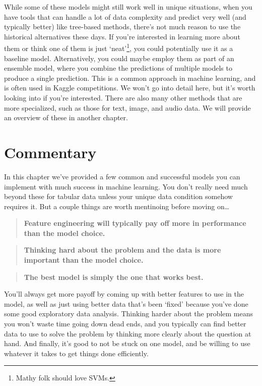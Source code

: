 \documentclass[
  letterpaper,
]{krantz}
\begin{document}
While some of these models might still work well in unique situations,
when you have tools that can handle a lot of data complexity and predict
very well (and typically better) like tree-based methods, there's not
much reason to use the historical alternatives these days. If you're
interested in learning more about them or think one of them is just
`neat'\footnote{Mathy folk should love SVMs.}, you could potentially use
it as a baseline model. Alternatively, you could maybe employ them as
part of an ensemble model, where you combine the predictions of multiple
models to produce a single prediction. This is a common approach in
machine learning, and is often used in Kaggle competitions. We won't go
into detail here, but it's worth looking into if you're interested.
There are also many other methods that are more specialized, such as
those for text, image, and audio data. We will provide an overview of
these in another chapter.

\section{Commentary}\label{commentary-4}

In this chapter we've provided a few common and successful models you
can implement with much success in machine learning. You don't really
need much beyond these for tabular data unless your unique data
condition somehow requires it. But a couple things are worth mentinoing
before moving on\ldots{}

\begin{quote}
\textbf{Feature engineering will typically pay off more in performance
than the model choice.}
\end{quote}

\begin{quote}
\textbf{Thinking hard about the problem and the data is more important
than the model choice.}
\end{quote}

\begin{quote}
\textbf{The best model is simply the one that works best.}
\end{quote}

You'll always get more payoff by coming up with better features to use
in the model, as well as just using better data that's been `fixed'
because you've done some good exploratory data analysis. Thinking harder
about the problem means you won't waste time going down dead ends, and
you typically can find better data to use to solve the problem by
thinking more clearly about the question at hand. And finally, it's good
to not be stuck on one model, and be willing to use whatever it takes to
get things done efficiently.
\end{document}
